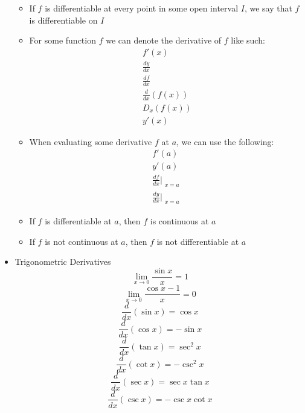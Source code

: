 \documentclass{article}
\begin{document}
\begin{itemize}
\begin{itemize}
        \item If $f$ is differentiable at every point in some open interval $I$, we say that $f$ is differentiable on $I$
        \item For some function $f$ we can denote the derivative of $f$ like such:
        \begin{eqnarray}
            f'(x) \\
            \frac{dy}{dx} \\
            \frac{df}{dx} \\
            \frac{d}{dx}(f(x)) \\
            D_x (f(x)) \\
            y'(x)
        \end{eqnarray}
        \item When evaluating some derivative $f$ at $a$, we can use the following:
        \begin{eqnarray}
            f'(a) \\
            y'(a) \\
            \frac{df}{dx}\Bigr|_{\substack{x=a}} \\
            \frac{dy}{dx}\Bigr|_{\substack{x=a}}
        \end{eqnarray}
        \item If $f$ is differentiable at $a$, then $f$ is continuous at $a$
        \item If $f$ is not continuous at $a$, then $f$ is not differentiable at $a$
    \end{itemize}
    \item Trigonometric Derivatives
    $$\lim_{x \to 0}{\frac{\sin{x}}{x}} = 1$$
    $$\lim_{x \to 0}{\frac{\cos{x} - 1}{x}} = 0$$
    $$\frac{d}{dx}\left(\sin{x}\right) = \cos{x}$$
    $$\frac{d}{dx}\left(\cos{x}\right) = - \sin{x}$$
    $$\frac{d}{dx}\left(\tan{x}\right) = \sec^2{x}$$
    $$\frac{d}{dx}\left(\cot{x}\right) = - \csc^2{x}$$
    $$\frac{d}{dx}\left(\sec{x}\right) = \sec{x}\tan{x}$$
    $$\frac{d}{dx}\left(\csc{x}\right) = - \csc{x}\cot{x}$$
\end{itemize}
\end{document}
